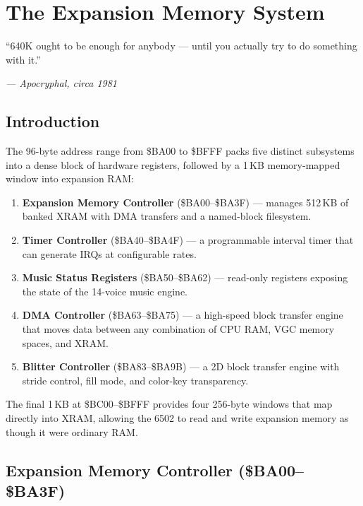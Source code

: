 \chapter{The Expansion Memory System}

\epigraph{``640K ought to be enough for anybody --- until you actually try to
do something with it.''}{\textit{--- Apocryphal, circa 1981}}

\section*{Introduction}

The 96-byte address range from \$BA00 to \$BFFF packs five distinct
subsystems into a dense block of hardware registers, followed by a 1\,KB
memory-mapped window into expansion RAM:

\begin{enumerate}
  \item \textbf{Expansion Memory Controller} (\$BA00--\$BA3F) --- manages
        512\,KB of banked XRAM with DMA transfers and a named-block filesystem.
  \item \textbf{Timer Controller} (\$BA40--\$BA4F) --- a programmable interval
        timer that can generate IRQs at configurable rates.
  \item \textbf{Music Status Registers} (\$BA50--\$BA62) --- read-only
        registers exposing the state of the 14-voice music engine.
  \item \textbf{DMA Controller} (\$BA63--\$BA75) --- a high-speed block
        transfer engine that moves data between any combination of CPU RAM,
        VGC memory spaces, and XRAM.
  \item \textbf{Blitter Controller} (\$BA83--\$BA9B) --- a 2D block transfer
        engine with stride control, fill mode, and color-key transparency.
\end{enumerate}

The final 1\,KB at \$BC00--\$BFFF provides four 256-byte windows that
map directly into XRAM, allowing the 6502 to read and write expansion
memory as though it were ordinary RAM.


\section{Expansion Memory Controller (\$BA00--\$BA3F)}
\label{sec:xmc-registers}

